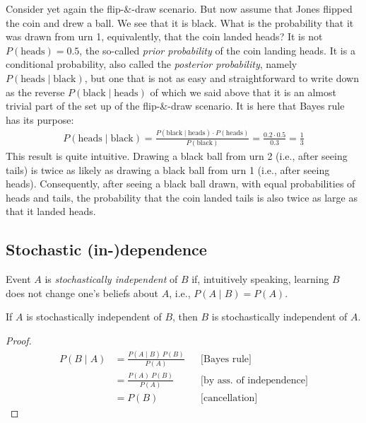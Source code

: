 \documentclass[nobib,nofonts]{tufte-handout}
\newcommand{\mult}{\ensuremath{\cdot}}
\begin{document}
Consider yet again the flip-\&-draw scenario. But now assume that Jones flipped the coin and
drew a ball. We see that it is black. What is the probability that it was drawn from urn 1,
equivalently, that the coin landed heads? It is not $P(\text{heads}) = 0.5$, the so-called
\emph{prior probability} of the coin landing heads. It is a conditional probability, also
called the \emph{posterior probability}, namely $P(\text{heads} \mid \text{black})$, but one
that is not as easy and straightforward to write down as the reverse
$P(\text{black} \mid \text{heads})$ of which we said above that it is an almost trivial part of
the set up of the flip-\&-draw scenario. It is here that Bayes rule has its purpose:
\begin{align*}
  P(\text{heads} \mid \text{black}) = \frac{P(\text{black} \mid \text{heads}) \mult P(\text{heads})}{P(\text{black})} =
  \frac{0.2 \mult 0.5}{0.3} = \frac{1}{3}
\end{align*}
This result is quite intuitive. Drawing a black ball from urn 2 (i.e., after seeing tails) is twice
as likely as drawing a black ball from urn 1 (i.e., after seeing heads). Consequently, after
seeing a black ball drawn, with equal probabilities of heads and tails, the probability that
the coin landed tails is also twice as large as that it landed heads.

\subsection{Stochastic (in-)dependence}

Event $A$ is \emph{stochastically independent} of $B$ if, intuitively speaking, learning $B$ does not change one's beliefs about $A$, i.e., $P(A \mid B) = P(A)$.

\begin{claim}
  If $A$ is stochastically independent of $B$, then $B$ is stochastically independent of $A$.
\end{claim}
\begin{proof}
  \begin{align*}
    P(B \mid A)
    & =
      \frac{P(A \mid B) \ P(B)}{P(A)} && \text{[Bayes rule]}
    \\
    & =
      \frac{P(A) \ P(B)}{P(A)} && \text{[by ass. of independence]}
    \\
    & =
      P(B) && \text{[cancellation]}
  \end{align*}
\end{proof}
\end{document}
